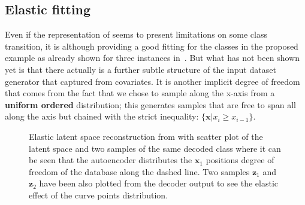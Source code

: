 \subsection{Elastic fitting}
Even if the representation of  seems to present limitations on some class transition, it is although providing a good fitting for the classes in the proposed example as already shown for three instances in~\Figure{\ref{fig:step_1}}. But what has not been shown yet is that there actually is a further subtle structure of the input dataset generator that  captured from covariates. It is another implicit degree of freedom that comes from the fact that we chose to sample along the x-axis from a \textbf{uniform ordered} distribution; this generates samples that are free to span all along the axis but chained with the strict inequality: $\{\bm{x} | x_{i} \geqslant x_{i-1}\}$.
\begin{figure}
    \centering
    \caption{Elastic latent space reconstruction from  with scatter plot of the latent space and two samples of the same decoded class where it can be seen that the autoencoder distributes the $\bm{x}_1$ positions degree of freedom of the database along the dashed line. Two samples $\bm{z}_1$ and $\bm{z}_2$ have been also plotted from the decoder output to see the elastic effect of the curve points distribution. } 
    \label{fig:step1_elastic}
\end{figure}
